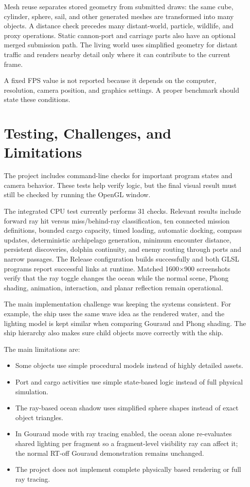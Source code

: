 \documentclass[12pt,a4paper]{report}
\begin{document}
Mesh reuse separates stored geometry from submitted draws: the same cube, cylinder, sphere, sail, and other generated meshes are transformed into many objects. A distance check precedes many distant-world, particle, wildlife, and proxy operations. Static cannon-port and carriage parts also have an optional merged submission path. The living world uses simplified geometry for distant traffic and renders nearby detail only where it can contribute to the current frame.

A fixed FPS value is not reported because it depends on the computer, resolution, camera position, and graphics settings. A proper benchmark should state these conditions.

\section{Testing, Challenges, and Limitations}
The project includes command-line checks for important program states and camera behavior. These tests help verify logic, but the final visual result must still be checked by running the OpenGL window.

The integrated CPU test currently performs 31 checks. Relevant results include forward ray hit versus miss/behind-ray classification, ten connected mission definitions, bounded cargo capacity, timed loading, automatic docking, compass updates, deterministic archipelago generation, minimum encounter distance, persistent discoveries, dolphin continuity, and enemy routing through ports and narrow passages. The Release configuration builds successfully and both GLSL programs report successful links at runtime. Matched 1600\(\times\)900 screenshots verify that the ray toggle changes the ocean while the normal scene, Phong shading, animation, interaction, and planar reflection remain operational.

The main implementation challenge was keeping the systems consistent. For example, the ship uses the same wave idea as the rendered water, and the lighting model is kept similar when comparing Gouraud and Phong shading. The ship hierarchy also makes sure child objects move correctly with the ship.

The main limitations are:
\begin{itemize}
    \item Some objects use simple procedural models instead of highly detailed assets.
    \item Port and cargo activities use simple state-based logic instead of full physical simulation.
    \item The ray-based ocean shadow uses simplified sphere shapes instead of exact object triangles.
    \item In Gouraud mode with ray tracing enabled, the ocean alone re-evaluates shared lighting per fragment so a fragment-level visibility ray can affect it; the normal RT-off Gouraud demonstration remains unchanged.
    \item The project does not implement complete physically based rendering or full ray tracing.
\end{itemize}
\end{document}
